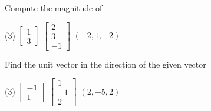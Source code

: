 \setcounter{exercise}{100}

\begin{exercise}
Compute the magnitude of
\begin{tasks}(3)
\task
$\begin{bmatrix}
1 \\
3
\end{bmatrix}
$
\task
$\begin{bmatrix}
2 \\
3 \\
-1
\end{bmatrix}
$
\task
$(-2,1,-2)$
\end{tasks}
\end{exercise}

\begin{exercise}
Find the unit vector in the direction of the given vector
\begin{tasks}(3)
\task
$\begin{bmatrix}
-1 \\
1 
\end{bmatrix}
$
\task
$\begin{bmatrix}
1 \\
-1 \\
2
\end{bmatrix}
$
\task
$(2,-5,2)$
\end{tasks}
\end{exercise}

